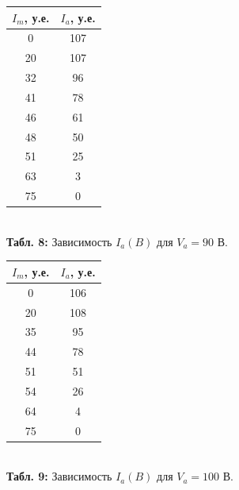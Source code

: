 \documentclass[12pt,a4paper]{scrartcl}
\begin{document}
		\begin{figure}[h]
	\begin{minipage}{0.5\linewidth}
	\begin{center}
\begin{tabular}{|c|c|}
\hline
$I_m$, у.е. & $I_a$, у.е. \\ \hline
0 & 107  \\ \hline
20 & 107  \\ \hline
32 & 96  \\ \hline
41 & 78  \\ \hline
46 & 61  \\ \hline
48 & 50  \\ \hline
51 & 25  \\ \hline
63 & 3  \\ \hline
75 & 0  \\ \hline
\end{tabular}\\
\textbf{Табл. 8:} Зависимость $I_a(B)$ для $V_a = 90$ В.
\end{center}
	\end{minipage}
	\begin{minipage}{0.5\linewidth}
	\begin{center}
\begin{tabular}{|c|c|}
\hline
$I_m$, у.е. & $I_a$, у.е. \\ \hline
0 & 106  \\ \hline
20 & 108  \\ \hline
35 & 95  \\ \hline
44 & 78  \\ \hline
51 & 51  \\ \hline
54 & 26  \\ \hline
64 & 4  \\ \hline
75 & 0  \\ \hline
\end{tabular}\\
\textbf{Табл. 9:} Зависимость $I_a(B)$ для $V_a = 100$ В.
\end{center}
	\end{minipage}
	\end{figure}
	
\end{document}
